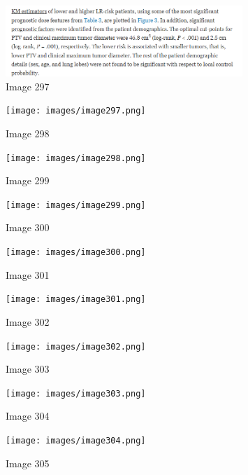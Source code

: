 \documentclass{article}%
\begin{document}
%


\begin{figure}[h!]%
\centering%
\includegraphics[width=0.8\textwidth]{images/image296.png}%
\caption{Image 297}%
\end{figure}

%


\begin{figure}[h!]%
\centering%
\texttt{[image: images/image297.png]}%
\caption{Image 298}%
\end{figure}

%


\begin{figure}[h!]%
\centering%
\texttt{[image: images/image298.png]}%
\caption{Image 299}%
\end{figure}

%


\begin{figure}[h!]%
\centering%
\texttt{[image: images/image299.png]}%
\caption{Image 300}%
\end{figure}

%


\begin{figure}[h!]%
\centering%
\texttt{[image: images/image300.png]}%
\caption{Image 301}%
\end{figure}

%


\begin{figure}[h!]%
\centering%
\texttt{[image: images/image301.png]}%
\caption{Image 302}%
\end{figure}

%


\begin{figure}[h!]%
\centering%
\texttt{[image: images/image302.png]}%
\caption{Image 303}%
\end{figure}

%


\begin{figure}[h!]%
\centering%
\texttt{[image: images/image303.png]}%
\caption{Image 304}%
\end{figure}

%


\begin{figure}[h!]%
\centering%
\texttt{[image: images/image304.png]}%
\caption{Image 305}%
\end{figure}
\end{document}
